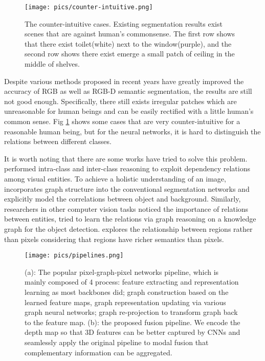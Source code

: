 ﻿\documentclass[journal]{IEEEtran}
\begin{document}
\begin{figure}
    \centering
    \texttt{[image: pics/counter-intuitive.png]}
    \caption{The counter-intuitive cases. Existing segmentation results exist scenes that are against human's commonsense. The first row shows that there exist toilet(white) next to the window(purple), and the second row shows there exist emerge a small patch of ceiling in the middle of shelves. }
    \label{fig_counter_intuitive}
\end{figure}

 
    Despite various methods proposed in recent years have greatly improved the accuracy of RGB as well as RGB-D semantic segmentation, the results are still not good enough. Specifically, there still exists irregular patches which are unreasonable for human beings and can be easily rectified with a little human's common sense. Fig \ref{fig_counter_intuitive} shows some cases that are very counter-intuitive for a reasonable human being, but for the neural networks, it is hard to distinguish the relations between different classes.

 
    It is worth noting that there are some works have tried to solve this problem. \cite{liu2021exploit} performed intra-class and inter-class reasoning to exploit dependency relations among visual entities. To achieve a holistic understanding of an image, \cite{wu2020bidirectional} incorporates graph structure into the conventional segmentation networks and explicitly model the correlations between object and background. Similarly, researchers in other computer vision tasks noticed the importance of relations between entities, \cite{zhou2021relation} tried to learn the relations via graph reasoning on a knowledge graph for the object detection. \cite{wang2020region} explores the relationship between regions rather than pixels considering that regions have richer semantics than pixels. 
    
\begin{figure}
    \centering
    \texttt{[image: pics/pipelines.png]}
    \caption{(a): The popular pixel-graph-pixel networks pipeline, which is mainly composed of 4 process:  feature extracting and representation learning as most backbones did; graph construction based on the learned feature maps, graph representation updating via various graph neural networks; graph re-projection to transform graph back to the feature map. (b): the proposed fusion pipeline. We encode the depth map so that 3D features can be better captured by CNNs and seamlessly apply the original pipeline to modal fusion that complementary information can be aggregated.}
    \label{fig_pipeline}
\end{figure}
\end{document}
